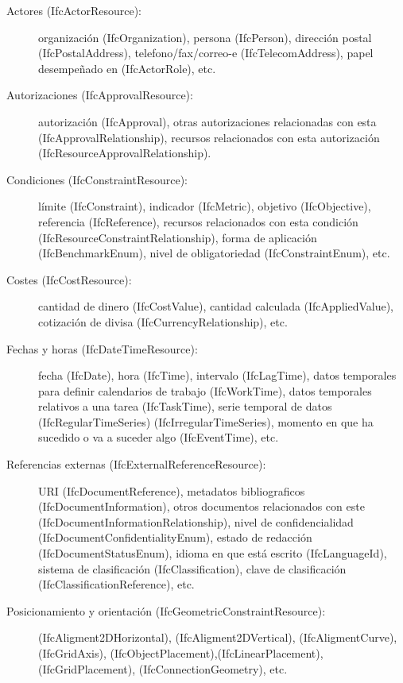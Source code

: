 \documentclass[spanish,12pt,a4paper,final,oneside]{book}
\begin{document}
\begin{description}
\item[Actores (IfcActorResource):] organización (IfcOrganization), persona (IfcPerson), dirección postal (IfcPostalAddress), telefono/fax/correo-e (IfcTelecomAddress), papel  desempeñado en (IfcActorRole), etc.

\item[Autorizaciones (IfcApprovalResource):] autorización (IfcApproval), otras autorizaciones relacionadas con esta (IfcApprovalRelationship), recursos relacionados con esta autorización (IfcResourceApprovalRelationship).

\item[Condiciones (IfcConstraintResource):] límite (IfcConstraint), indicador (IfcMetric), objetivo (IfcObjective), referencia (IfcReference), recursos relacionados con esta condición (IfcResourceConstraintRelationship), forma de aplicación (IfcBenchmarkEnum), nivel de obligatoriedad (IfcConstraintEnum), etc.

\item[Costes (IfcCostResource):] cantidad de dinero (IfcCostValue), cantidad calculada (IfcAppliedValue), cotización de divisa (IfcCurrencyRelationship), etc.

\item[Fechas y horas (IfcDateTimeResource):] fecha (IfcDate), hora (IfcTime), intervalo (IfcLagTime), datos temporales para definir calendarios de trabajo (IfcWorkTime), datos temporales relativos a una tarea (IfcTaskTime), serie temporal de datos (IfcRegularTimeSeries) (IfcIrregularTimeSeries), momento en que ha sucedido o va a suceder algo (IfcEventTime), etc.

\item[Referencias externas (IfcExternalReferenceResource):] URI (IfcDocumentReference), metadatos bibliograficos (IfcDocumentInformation), otros documentos relacionados con este (IfcDocumentInformationRelationship), nivel de confidencialidad (IfcDocumentConfidentialityEnum), estado de redacción (IfcDocumentStatusEnum), idioma en que está escrito (IfcLanguageId), sistema de clasificación (IfcClassification), clave de clasificación (IfcClassificationReference), etc.

\item[Posicionamiento y orientación  (IfcGeometricConstraintResource):]  (IfcAligment2DHorizontal), (IfcAligment2DVertical), (IfcAligmentCurve), (IfcGridAxis), (IfcObjectPlacement),(IfcLinearPlacement), (IfcGridPlacement), (IfcConnectionGeometry), etc.


\end{description}
\end{document}

